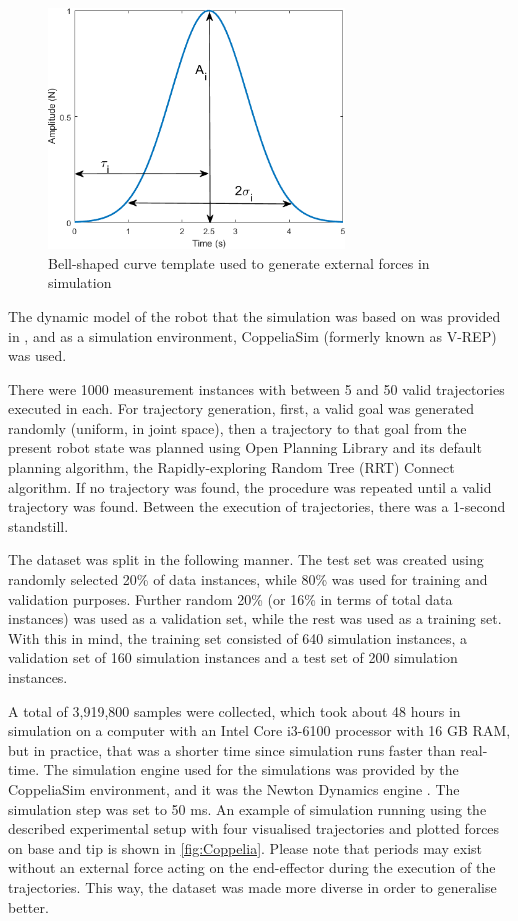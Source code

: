 \begin{figure}
    \centering
    \includegraphics[width=0.7\textwidth]{slike/bell.png}
    \caption{Bell-shaped curve template used to generate external forces in simulation}
    \label{fig:Bell}
\end{figure}

The dynamic model of the robot that the simulation was based on was provided in \cite{Gaz2019}, and as a simulation environment, CoppeliaSim (formerly known as V-REP) \cite{Rohmer2013} was used.

There were 1000 measurement instances with between 5 and 50 valid trajectories executed in each. For trajectory generation, first, a valid goal was generated randomly (uniform, in joint space), then a trajectory to that goal from the present robot state was planned using Open Planning Library \cite{Sucan2012} and its default planning algorithm, the Rapidly-exploring Random Tree (RRT) Connect algorithm. If no trajectory was found, the procedure was repeated until a valid trajectory was found. Between the execution of trajectories, there was a 1-second standstill. 

The dataset was split in the following manner. The test set was created using randomly selected 20\% of data instances, while 80\% was used for training and validation purposes. Further random 20\% (or 16\% in terms of total data instances) was used as a validation set, while the rest was used as a training set. With this in mind, the training set consisted of 640 simulation instances, a validation set of 160 simulation instances and a test set of 200 simulation instances.

A total of 3,919,800 samples were collected, which took about 48 hours in simulation on a computer with an Intel Core i3-6100 processor with 16 GB RAM, but in practice, that was a shorter time since simulation runs faster than real-time. The simulation engine used for the simulations was provided by the CoppeliaSim environment, and it was the Newton Dynamics engine \cite{Massera2007}. The simulation step was set to 50 ms. An example of simulation running using the described experimental setup with four visualised trajectories and plotted forces on base and tip is shown in \cref{fig:Coppelia}. Please note that periods may exist without an external force acting on the end-effector during the execution of the trajectories. This way, the dataset was made more diverse in order to generalise better. 

